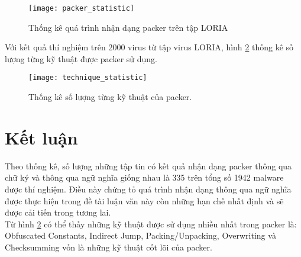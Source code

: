 \begin{figure}
\centering
\texttt{[image: packer\_statistic]}
\caption{Thống kê quá trình nhận dạng packer trên tập LORIA}
\label{fig:PackerStat}
\end{figure}

\hspace{0.5cm}Với kết quả thí nghiệm trên 2000 virus từ tập virus LORIA, hình \ref {fig:TechStat} thống kê số lượng từng kỹ thuật được packer sử dụng.

\begin{figure}
\centering
\texttt{[image: technique\_statistic]}
\caption{Thống kê số lượng từng kỹ thuật của packer.}
\label{fig:TechStat}
\end{figure}

\section{Kết luận}

\hspace{0.5cm}Theo thống kê, số lượng những tập tin có kết quả nhận dạng packer thông qua chữ ký và thông qua ngữ nghĩa giống nhau là 335 trên tổng số 1942 malware được thí nghiệm. Điều này chứng tỏ quá trình nhận dạng thông qua ngữ nghĩa được thực hiện trong đề tài luận văn này còn những hạn chế nhất định và sẽ được cải tiến trong tương lai.\\

\hspace{0.5cm}Từ hình \ref {fig:TechStat} có thể thấy những kỹ thuật được sử dụng nhiều nhất trong packer là: Obfuscated Constants, Indirect Jump, Packing/Unpacking, Overwriting và Checksumming vốn là những kỹ thuật cốt lõi của packer.

